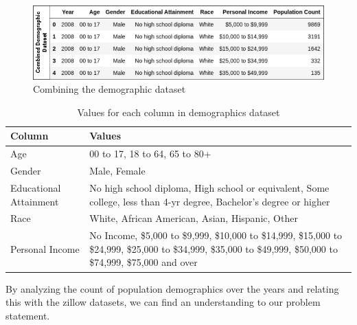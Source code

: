 \documentclass[journal]{IEEEtran}
\begin{document}
\begin{figure}[!htb]
	\centering
	\includegraphics[width=\linewidth]{demographics.drawio.png}
	\caption{Combining the demographic dataset}
	\label{fig:demo-data}
\end{figure}

\begin{table}[!htb]
	\caption{Values for each column in demographics dataset}
	\label{tab:demo-cols}
	\begin{tabularx}{\textwidth}{m{} X} %
		\toprule
		Column                 & Values                                                                                                                                                         \\
		\midrule
		Age                    & 00 to 17, 18 to 64, 65 to 80+                                                                                                                                  \\
		Gender                 & Male, Female                                                                                                                                                   \\
		Educational Attainment & No high school diploma, High school or equivalent, Some college, less than 4-yr degree, Bachelor's degree or higher                                            \\
		Race                   & White, African American, Asian, Hispanic, Other                                                                                                                \\
		Personal Income        & No Income, \$5,000 to \$9,999, \$10,000 to \$14,999, \$15,000 to \$24,999, \$25,000 to \$34,999, \$35,000 to \$49,999, \$50,000 to \$74,999, \$75,000 and over \\
		\bottomrule
	\end{tabularx}
\end{table}

By analyzing the count of population demographics over the years and relating
this with the zillow datasets, we can find an understanding to our problem
statement.
\end{document}
